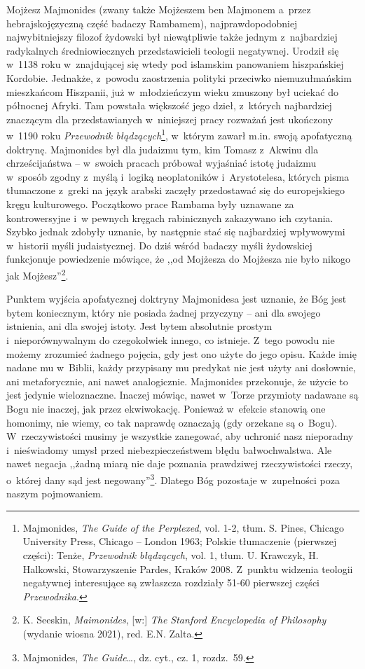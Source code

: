 Mojżesz Majmonides (zwany także Mojżeszem ben Majmonem a~przez hebrajskojęzyczną część badaczy Rambamem), najprawdopodobniej najwybitniejszy filozof żydowski był niewątpliwie także jednym z~najbardziej radykalnych średniowiecznych przedstawicieli teologii negatywnej. Urodził się w~1138 roku w~znajdującej się wtedy pod islamskim panowaniem hiszpańskiej Kordobie. Jednakże, z~powodu zaostrzenia polityki przeciwko niemuzułmańskim mieszkańcom Hiszpanii, już w~młodzieńczym wieku zmuszony był uciekać do północnej Afryki. Tam powstała większość jego dzieł, z~których najbardziej znaczącym dla przedstawianych w~niniejszej pracy rozważań jest ukończony w~1190 roku \textit{Przewodnik błądzących}\footnote{Majmonides, \textit{The Guide of the Perplexed}, vol. 1-2, tłum. S. Pines, Chicago University Press, Chicago -- London 1963; Polskie tłumaczenie (pierwszej części): Tenże, \textit{Przewodnik błądzących}, vol. 1, tłum. U. Krawczyk, H. Halkowski, Stowarzyszenie Pardes, Kraków 2008. Z~punktu widzenia teologii negatywnej interesujące są zwłaszcza rozdziały 51-60 pierwszej części \textit{Przewodnika}.}, w~którym zawarł m.in. swoją apofatyczną doktrynę. Majmonides był dla judaizmu tym, kim Tomasz z~Akwinu dla chrześcijaństwa -- w~swoich pracach próbował wyjaśniać istotę judaizmu w~sposób zgodny z~myślą i~logiką neoplatoników i~Arystotelesa, których pisma tłumaczone z~greki na język arabski zaczęły przedostawać się do europejskiego kręgu kulturowego. Początkowo prace Rambama były uznawane za kontrowersyjne i~w pewnych kręgach rabinicznych zakazywano ich czytania. Szybko jednak zdobyły uznanie, by następnie stać się najbardziej wpływowymi w~historii myśli judaistycznej. Do dziś wśród badaczy myśli żydowskiej funkcjonuje powiedzenie mówiące, że ,,od Mojżesza do Mojżesza nie było nikogo jak Mojżesz''\footnote{K. Seeskin, \textit{Maimonides}, [w:] \textit{The Stanford Encyclopedia of Philosophy} (wydanie wiosna 2021), red. E.N. Zalta.}.

Punktem wyjścia apofatycznej doktryny Majmonidesa jest uznanie, że Bóg jest bytem koniecznym, który nie posiada żadnej przyczyny -- ani dla swojego istnienia, ani dla swojej istoty. Jest bytem absolutnie prostym i~nieporównywalnym do czegokolwiek innego, co istnieje. Z~tego powodu nie możemy zrozumieć żadnego pojęcia, gdy jest ono użyte do jego opisu. Każde imię nadane mu w~Biblii, każdy przypisany mu predykat nie jest użyty ani dosłownie, ani metaforycznie, ani nawet analogicznie. Majmonides przekonuje, że użycie to jest jedynie wieloznaczne. Inaczej mówiąc, nawet w~Torze przymioty nadawane są Bogu nie inaczej, jak przez ekwiwokację. Ponieważ w~efekcie stanowią one homonimy, nie wiemy, co tak naprawdę oznaczają (gdy orzekane są o~Bogu). W~rzeczywistości musimy je wszystkie zanegować, aby uchronić nasz nieporadny i~nieświadomy umysł przed niebezpieczeństwem błędu bałwochwalstwa. Ale nawet negacja ,,żadną miarą nie daje poznania prawdziwej rzeczywistości rzeczy, o~której dany sąd jest negowany''\footnote{Majmonides, \textit{The Guide}…, dz. cyt., cz. 1, rozdz.~59.}. Dlatego Bóg pozostaje w~zupełności poza naszym pojmowaniem.

